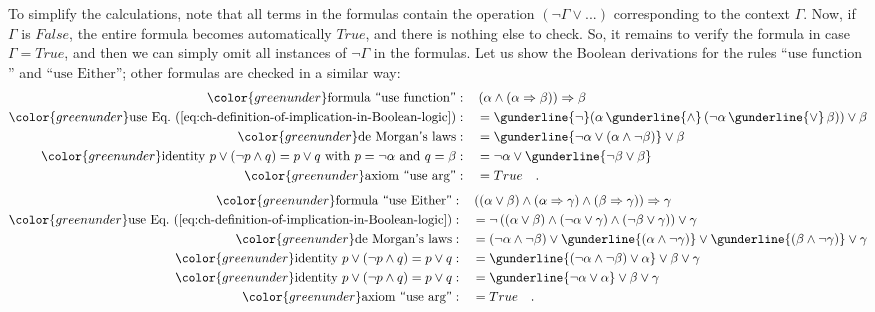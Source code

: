 To simplify the calculations, note that all terms in the formulas
contain the operation $\left(\neg\Gamma\vee...\right)$ corresponding
to the context $\Gamma$. Now, if $\Gamma$ is $False$, the entire
formula becomes automatically $True$, and there is nothing else to
check. So, it remains to verify the formula in case $\Gamma=True$,
and then we can simply omit all instances of $\neg\Gamma$ in the
formulas. Let us show the Boolean derivations for the rules \textsf{``}$\text{use function}$\textsf{''}
and \textsf{``}$\text{use Either}$\textsf{''}; other formulas are checked in a similar
way:
\begin{align*}
{\color{greenunder}\text{formula \textsf{``}use function\textsf{''}}:}\quad & \left(\alpha\wedge\left(\alpha\Rightarrow\beta\right)\right)\Rightarrow\beta\\
{\color{greenunder}\text{use Eq.~(\ref{eq:ch-definition-of-implication-in-Boolean-logic})}:}\quad & =\gunderline{\neg}(\alpha\,\gunderline{\wedge}\,(\neg\alpha\,\gunderline{\vee}\,\beta))\vee\beta\\
{\color{greenunder}\text{de Morgan\textsf{'}s laws}:}\quad & =\gunderline{\neg\alpha\vee(\alpha\wedge\neg\beta)}\vee\beta\\
{\color{greenunder}\text{identity }p\vee(\neg p\wedge q)=p\vee q\text{ with }p=\neg\alpha\text{ and }q=\beta:}\quad & =\neg\alpha\vee\gunderline{\neg\beta\vee\beta}\\
{\color{greenunder}\text{axiom \textsf{``}use arg\textsf{''}}:}\quad & =True\quad.
\end{align*}
\begin{align*}
{\color{greenunder}\text{formula \textsf{``}use Either\textsf{''}}:}\quad & \left(\left(\alpha\vee\beta\right)\wedge\left(\alpha\Rightarrow\gamma\right)\wedge\left(\beta\Rightarrow\gamma\right)\right)\Rightarrow\gamma\\
{\color{greenunder}\text{use Eq.~(\ref{eq:ch-definition-of-implication-in-Boolean-logic})}:}\quad & =\neg\left(\left(\alpha\vee\beta\right)\wedge\left(\neg\alpha\vee\gamma\right)\wedge\left(\neg\beta\vee\gamma\right)\right)\vee\gamma\\
{\color{greenunder}\text{de Morgan\textsf{'}s laws}:}\quad & =\left(\neg\alpha\wedge\neg\beta\right)\vee\gunderline{\left(\alpha\wedge\neg\gamma\right)}\vee\gunderline{\left(\beta\wedge\neg\gamma\right)}\vee\gamma\\
{\color{greenunder}\text{identity }p\vee(\neg p\wedge q)=p\vee q:}\quad & =\gunderline{\left(\neg\alpha\wedge\neg\beta\right)\vee\alpha}\vee\beta\vee\gamma\\
{\color{greenunder}\text{identity }p\vee(\neg p\wedge q)=p\vee q:}\quad & =\gunderline{\neg\alpha\vee\alpha}\vee\beta\vee\gamma\\
{\color{greenunder}\text{axiom \textsf{``}use arg\textsf{''}}:}\quad & =True\quad.
\end{align*}
